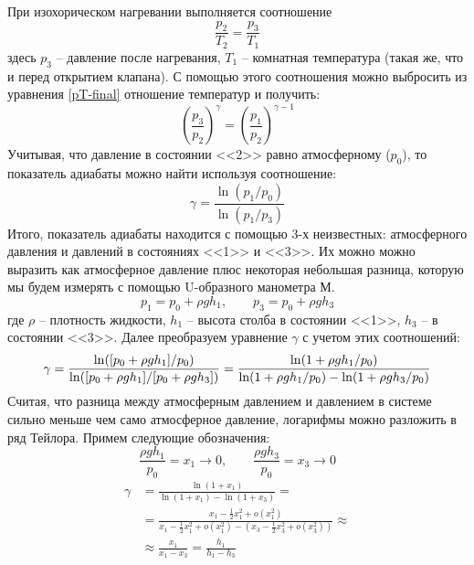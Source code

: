 \documentclass[a4paper,12pt]{article}
\begin{document}
        При изохорическом нагревании выполняется соотношение
        \begin{equation}
            \frac{p_2}{T_2}=\frac{p_3}{T_1}   
        \end{equation}
        здесь $p_3$ -- давление после нагревания, $T_1$ -- комнатная температура (такая же, что и перед открытием клапана). С помощью этого соотношения можно выбросить из уравнения \eqref{pT-final} отношение температур и получить:
        \begin{equation}
            \label{P-final}
            \left(\frac{p_3}{p_2}\right)^\gamma = \left(\frac{p_1}{p_2}\right)^{\gamma-1}
        \end{equation}
        Учитывая, что давление в состоянии <<2>> равно атмосферному ($p_0$), то показатель адиабаты можно найти используя соотношение:
        \begin{equation}
            \label{gamma}
            \gamma = \frac{\ln(p_1/p_0)}{\ln(p_1/p_3)}
        \end{equation}
        Итого, показатель адиабаты находится с помощью 3-х неизвестных: атмосферного давления и давлений в состояниях <<1>> и <<3>>. Их можно можно выразить как атмосферное давление плюс некоторая небольшая разница, которую мы будем измерять с помощью U-образного манометра М.
        \begin{equation*}
            p_1=p_0+\rho gh_1, \qquad p_3=p_0+\rho gh_3
        \end{equation*}
        где $\rho$ -- плотность жидкости, $h_1$ -- высота столба в состоянии <<1>>, $h_3$ -- в состоянии <<3>>. Далее преобразуем уравнение $\gamma$ с учетом этих соотношений:
        \begin{equation*}
            \gamma=\frac{\ln([p_0+\rho gh_1]/p_0)}{\ln([p_0+\rho gh_1]/[p_0+\rho gh_3])}=\frac{\ln(1+\rho gh_1/p_0)}{\ln (1+\rho gh_1/p_0)-\ln(1+\rho gh_3/p_0)}\\ 
        \end{equation*}
        Считая, что разница между атмосферным давлением и давлением в системе сильно меньше чем само атмосферное давление, логарифмы можно разложить в ряд Тейлора. Примем следующие обозначения:
        \begin{equation*}
            \frac{\rho gh_1}{p_0}=x_1\rightarrow0, \qquad \frac{\rho g h_3}{p_0}=x_3\rightarrow 0
        \end{equation*}
        \begin{align}
            \nonumber \gamma&=\frac{\ln(1+x_1)}{\ln(1+x_1)-\ln(1+x_3)}=\\
            \nonumber&=\frac{x_1-\frac{1}{2}x_1^2+o(x_1^2)}{x_1-\frac{1}{2}x_1^2+o(x_1^2)-(x_3-\frac{1}{2}x_3^2+o(x_3^2))}\approx\\ 
            &\approx \frac{x_1}{x_1-x_3}=\frac{h_1}{h_1-h_3} \label{final gamma via h}
        \end{align}
\end{document}
